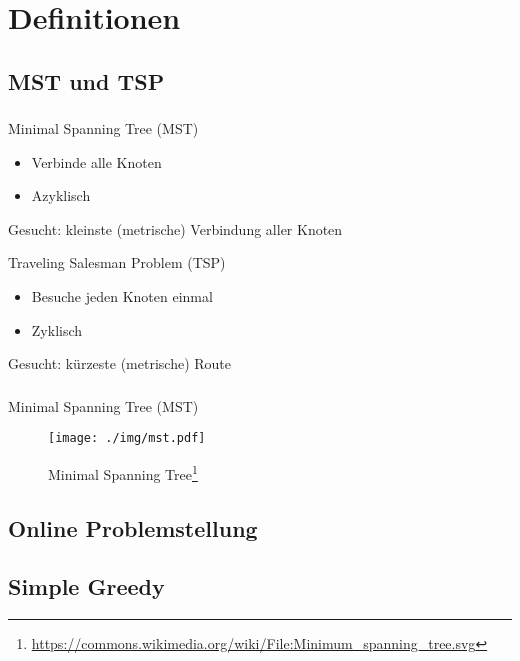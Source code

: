 \section{Definitionen}
\subsection{MST und TSP}

\begin{frame}
    \frametitle{\insertsubsection}
    \begin{block}{Minimal Spanning Tree (MST)}
        \vspace{1em}
        \begin{itemize}
            \itemsep\setlength{.8em}
            \item Verbinde alle Knoten
            \item Azyklisch
        \end{itemize}
        Gesucht: kleinste (metrische) Verbindung aller Knoten
    \end{block}
    \vspace{1em}
    \begin{block}{Traveling Salesman Problem (TSP)}
        \vspace{1em}
        \begin{itemize}
            \itemsep\setlength{.8em}
            \item Besuche jeden Knoten einmal
            \item Zyklisch
        \end{itemize}
        Gesucht: kürzeste (metrische) Route
    \end{block}
\end{frame}

\begin{frame}
    \frametitle{\insertsubsection}
    Minimal Spanning Tree (MST)
    \begin{figure}
        \centering
        \texttt{[image: ./img/mst.pdf]}
        \caption{Minimal Spanning Tree\footnote{\url{https://commons.wikimedia.org/wiki/File:Minimum_spanning_tree.svg}}}
    \end{figure}
\end{frame}


\subsection{Online Problemstellung}
\subsection{Simple Greedy}